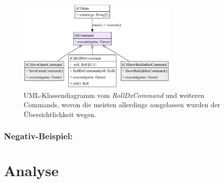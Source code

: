 \begin{figure}[H]
	\centering
	\includegraphics[width=0.7\textwidth]{Bilder/RollDxCommand_structure.pdf} 
	\caption{UML-Klassendiagramm vom \textit{RollDxCommand} und weiteren Commands, 
	wovon die meisten allerdings ausgelassen wurden der Übersichtlichkeit wegen.}
	\label{fig:ocp-rolldx}
\end{figure} 

\subsubsection{Negativ-Beispiel:}


\section{Analyse }

